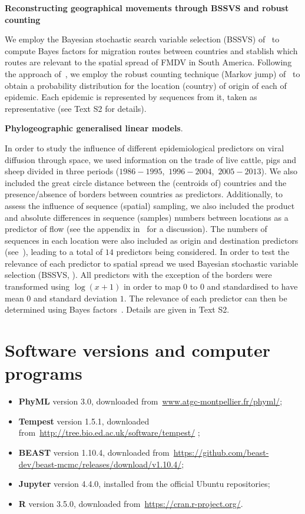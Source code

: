 \documentclass[10pt]{article}
\begin{document}
\textbf{Reconstructing geographical movements through BSSVS and robust counting}

We employ the Bayesian stochastic search variable selection (BSSVS) of~\cite{Lemey2009} to compute Bayes factors for migration routes between countries and stablish which routes are relevant to the spatial spread of FMDV in South America.
Following the approach of~\cite{Hall2013}, we employ the robust counting technique (Markov jump) of~\cite{Minin2008b} to obtain a probability distribution for the location (country) of origin of each of epidemic.
Each epidemic is represented by sequences from it, taken as representative (see Text S2 for details).

\textbf{Phylogeographic generalised linear models}.

In order to study the influence of different epidemiological predictors on viral diffusion through space, we used information on the trade of live cattle, pigs and sheep divided in three periods ($1986-1995$,~$1996-2004$,~$2005-2013$).
We also included the great circle distance between the (centroids of) countries and the presence/absence of borders between countries as predictors.
Additionally, to assess the influence of sequence (spatial) sampling, we also included the product and absolute differences in sequence (samples) numbers between locations as a predictor of flow (see the appendix in~\cite{Lemey2014} for a discussion).
The numbers of sequences in each location were also included as origin and destination predictors (see~\cite{Dudas2017}), leading to a total of $14$ predictors being considered.
In order to test the relevance of each predictor to spatial spread we used Bayesian stochastic variable selection (BSSVS, \cite{Lemey2009}).
All predictors with the exception of the borders were transformed using $\log(x +1)$ in order to map $0$ to $0$ and standardised to have mean $0$ and standard deviation $1$.
The relevance of each predictor can then be determined using Bayes factors~\citep{KassRaftery1995,Lemey2009,Lemey2014}.
Details are given in Text S2.

\section*{Software versions and computer programs}

\begin{itemize}
 \item \textbf{PhyML} version 3.0, downloaded from~\url{www.atgc-montpellier.fr/phyml/};
 \item \textbf{Tempest} version 1.5.1, downloaded from~\url{http://tree.bio.ed.ac.uk/software/tempest/}  ;
 \item \textbf{BEAST} version 1.10.4, downloaded from~\url{https://github.com/beast-dev/beast-mcmc/releases/download/v1.10.4/};
 \item  \textbf{Jupyter} version 4.4.0, installed from the official Ubuntu repositories;
 \item \textbf{R} version 3.5.0, downloaded from~\url{https://cran.r-project.org/}.
\end{itemize}
\end{document}
